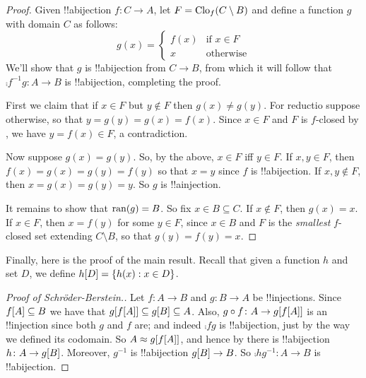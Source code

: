 \documentclass[../../../include/open-logic-section]{subfiles}
\begin{document}
\begin{proof}
Given !!a{bijection}  $f \colon C \to A$, let $F =
\Closureofunder{f}{C \setminus B}$ and define a function $g$ with
domain $C$ as follows:
\[
	g(x) = 
	\begin{cases}
			f(x) &\text{if $x \in F$}\\
			x & \text{otherwise}
		\end{cases}
\]
We'll show that $g$ is !!a{bijection} from $C \to B$, from which it
will follow that $\comp{f^{-1}}{g} \colon A \to B$ is !!a{bijection},
completing the proof.

First we claim that if $x \in F$ but $y\notin F$ then $g(x) \neq
g(y)$. For reductio suppose otherwise, so that $y = g(y) = g(x) =
f(x)$. Since $x \in F$ and $F$ is $f$-closed by ,
we have $y = f(x) \in F$, a contradiction. 

Now suppose $g(x) = g(y)$. So, by the above, $x \in F$ iff $y \in F$.
If $x, y \in F$, then $f(x) = g (x) = g(y) = f(y)$ so that $x = y$
since $f$ is !!a{bijection}. If  $x, y \notin F$, then $x = g(x) =
g(y) = y$. So $g$ is !!a{injection}.

It remains to show that $\ran{g} = B$. So fix $x \in B \subseteq C$.
If $x \notin F$, then $g(x) = x$. If $x \in F$, then $x = f(y)$ for
some $y \in F$, since $x \in B$ and $F$ is the \emph{smallest}
$f$-closed set extending $C \setminus B$, so that $g(y) = f(y) = x$.
\end{proof}

Finally, here is the proof of the main result. Recall that given a
function $h$ and set $D$, we define $\funimage{h}{D} = \Setabs{h(x)}{x
\in D}$. 

\begin{proof}[Proof of Schr\"oder-Berstein.] Let $f \colon A \to B$
and $g \colon B \to A$ be !!{injection}s. Since $\funimage{f}{A}
\subseteq B$ we have that $\funimage{g}{\funimage{f}{A}} \subseteq
g[B] \subseteq A$. Also, $\comp{f}{g} \colon A \to
\funimage{g}{\funimage{f}{A}}$ is an !!{injection} since both $g$ and
$f$ are; and indeed $\comp{f}{g}$ is !!a{bijection}, just by the way
we defined its codomain. So
$\cardeq{A}{\funimage{g}{\funimage{f}{A}}}$, and hence by
 there is !!a{bijection} $h \colon A \to
\funimage{g}{B}$. Moreover, $g^{-1}$ is !!a{bijection}
$\funimage{g}{B} \to B$. So $\comp{h}{g^{-1}} \colon A \to B$ is
!!a{bijection}. 
\end{proof}
\end{document}
